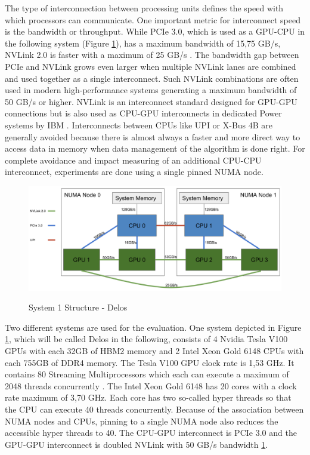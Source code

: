 The type of interconnection between processing units defines the speed with which processors can communicate. One important metric for interconnect speed is the bandwidth or throughput. While PCIe 3.0, which is used as a GPU-CPU in the following system (Figure \ref{fig:delos_arch}), has a maximum bandwidth of 15,75 GB/s, NVLink 2.0 is faster with a maximum of 25 GB/s \cite{zargesEvaluationOnNodeGPU}. The bandwidth gap between PCIe and NVLink grows even larger when multiple NVLink lanes are combined and used together as a single interconnect. Such NVLink combinations are often used in modern high-performance systems generating a maximum bandwidth of 50 GB/s or higher. NVLink is an interconnect standard designed for GPU-GPU connections but is also used as CPU-GPU interconnects in dedicated Power systems by IBM \cite{liEvaluatingModernGPU2020}. Interconnects between CPUs like UPI or X-Bus 4B are generally avoided because there is almost always a faster and more direct way to access data in memory when data management of the algorithm is done right. For complete avoidance and impact measuring of an additional CPU-CPU interconnect, experiments are done using a single pinned NUMA node.

\begin{figure}[H]
  \caption{System 1 Structure - Delos}
  \includegraphics[width=\textwidth]{figures/delos_system_arch.png}
  \centering
  \label{fig:delos_arch}
\end{figure}

Two different systems are used for the evaluation. One system depicted in Figure \ref{fig:delos_arch}, which will be called Delos in the following, consists of 4 Nvidia Tesla V100 GPUs with each 32GB of HBM2 memory and 2 Intel Xeon Gold 6148 CPUs with each 755GB of DDR4 memory. The Tesla V100 GPU clock rate is 1,53 GHz. It contains 80 Streaming Multiprocessors which each can execute a maximum of 2048 threads concurrently \cite{NVIDIATESLAV1002017}. The Intel Xeon Gold 6148 has 20 cores with a clock rate maximum of 3,70 GHz. Each core has two so-called hyper threads so that the CPU can execute 40 threads concurrently. Because of the association between NUMA nodes and CPUs, pinning to a single NUMA node also reduces the accessible hyper threads to 40. The CPU-GPU interconnect is PCIe 3.0 and the GPU-GPU interconnect is doubled NVLink with 50 GB/s bandwidth \ref{fig:delos_arch}.


